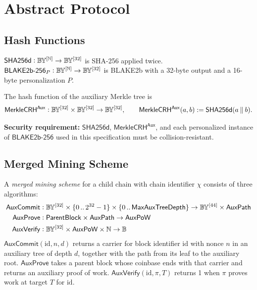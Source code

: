 \documentclass[10pt,letterpaper]{article}
\newcommand\term[1]{\textsl{#1}}
\newcommand\typ{\mathrel{\vcentcolon}}
\newcommand\B{\mathbb{B}}
\newcommand\BY{\mathbb{B}\kern-0.1em\mathbb{Y}}
\newcommand\Nat{\mathbb{N}}
\newcommand\fn[1]{\mathsf{#1}}
\newcommand\cat{\mathbin{\|}}
\newcommand\rules[1]{\par\textbf{#1}}
\theoremstyle{plain}
\begin{document}
\section{Abstract Protocol}\label{sec:abstract}

\subsection{Hash Functions}\label{sec:abstracthashes}

$\fn{SHA256d} \typ \BY^{[\Nat]} \to \BY^{[32]}$ is SHA-256 applied twice. $\fn{BLAKE2b\text{-}256}_P \typ \BY^{[\Nat]} \to \BY^{[32]}$ is BLAKE2b with a 32-byte output and a 16-byte personalization $P$.

The hash function of the auxiliary Merkle tree is
\[
\fn{MerkleCRH^{Aux}} \typ \BY^{[32]} \times \BY^{[32]} \to \BY^{[32]}, \qquad \fn{MerkleCRH^{Aux}}(a, b) := \fn{SHA256d}(a \cat b).
\]

\rules{Security requirement:} $\fn{SHA256d}$, $\fn{MerkleCRH^{Aux}}$, and each personalized instance of $\fn{BLAKE2b\text{-}256}$ used in this specification must be collision-resistant.

\subsection{Merged Mining Scheme}\label{sec:mmscheme}

A \term{merged mining scheme} for a child chain with chain identifier $\chi$ consists of three algorithms:
\begin{align*}
\fn{AuxCommit} &\typ \BY^{[32]} \times \{0\,..\,2^{32}-1\} \times \{0\,..\,\fn{MaxAuxTreeDepth}\} \to \BY^{[44]} \times \fn{AuxPath}\\
\fn{AuxProve} &\typ \fn{ParentBlock} \times \fn{AuxPath} \to \fn{AuxPoW}\\
\fn{AuxVerify} &\typ \BY^{[32]} \times \fn{AuxPoW} \times \Nat \to \B
\end{align*}
$\fn{AuxCommit}(\mathrm{id}, n, d)$ returns a carrier for block identifier $\mathrm{id}$ with nonce $n$ in an auxiliary tree of depth $d$, together with the path from its leaf to the auxiliary root. $\fn{AuxProve}$ takes a parent block whose coinbase ends with that carrier and returns an auxiliary proof of work. $\fn{AuxVerify}(\mathrm{id}, \pi, T)$ returns 1 when $\pi$ proves work at target $T$ for $\mathrm{id}$.
\end{document}
